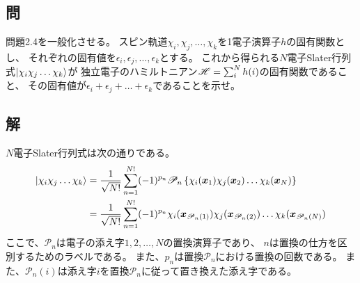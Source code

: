\subsection{問}
問題2.4を一般化させる。
スピン軌道$\chi_i,\chi_j,\dots,\chi_k$を1電子演算子$h$の固有関数とし、
それぞれの固有値を$\epsilon_i,\epsilon_j,\dots,\epsilon_k$とする。
これから得られる$N$電子Slater行列式$\ket{\chi_i\chi_j \dots\chi_k}$が
独立電子のハミルトニアン${\mathscr{H}}=\sum_i^N h(i)$の固有関数であること、
その固有値が$\epsilon_i+\epsilon_j+\dots+\epsilon_k$であることを示せ。


\subsection{解}
$N$電子Slater行列式は次の通りである。
\begin{align}
	\ket{\chi_i\chi_j\dots\chi_k}
&=
	\frac{1}{\sqrt{N!}}
	\sum_{n=1}^{N!}
		(-1)^{p_n}
		\mathscr{P}_n\left\{
			\chi_i(\x_1) \chi_j(\x_2) \dots \chi_k(\x_N)
		\right\} \\
%
%
&=
	\frac{1}{\sqrt{N!}}
	\sum_{n=1}^{N!}
		(-1)^{p_n}
		\chi_i(\x_{\mathscr{P}_n(1)})
		\chi_j(\x_{\mathscr{P}_n(2)})
		\dots
		\chi_k(\x_{\mathscr{P}_n(N)})
\end{align}
ここで、$\mathscr{P}_n$は電子の添え字$1,2,\dots,N$の置換演算子であり、
$n$は置換の仕方を区別するためのラベルである。
また、$p_n$は置換$\mathscr{P}_n$における置換の回数である。
また、$\mathscr{P}_n(i)$は添え字$i$を置換$\mathscr{P}_n$に従って置き換えた添え字である。

